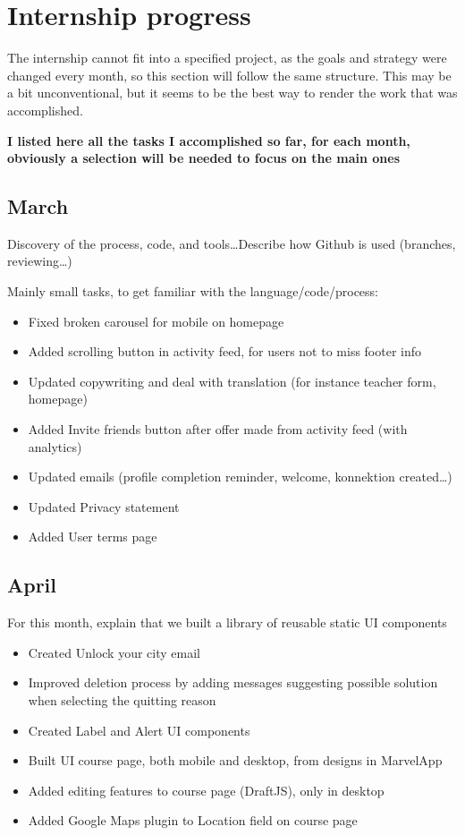 \section{Internship progress}
\label{sec:internship}

The internship cannot fit into a specified project, as the goals and strategy
were changed every month, so this section will follow the same structure.
This may be a bit unconventional, but it seems to be the best way to render
the work that was accomplished.

\textbf{I listed here all the tasks I accomplished so far, for each month,
obviously a selection will be needed to focus on the main ones}

\subsection{March}
\label{ssec:march}

Discovery of the process, code, and tools\ldots Describe how Github
is used (branches, reviewing\ldots)

Mainly small tasks, to get familiar with the language/code/process:
\begin{itemize}
\item Fixed broken carousel for mobile on homepage
\item Added scrolling button in activity feed, for users not to miss footer info
\item Updated copywriting and deal with translation (for instance teacher form,
homepage)
\item Added \guillemotleft Invite friends \guillemotright button after offer
made from activity feed (with analytics)
\item Updated emails (profile completion reminder, welcome, konnektion
created\ldots)
\item Updated Privacy statement
\item Added User terms page
\end{itemize}

\subsection{April}
\label{ssec:april}

For this month, explain that we built a library of reusable static UI components

\begin{itemize}
\item Created \guillemotleft Unlock your city \guillemotright email
\item Improved deletion process by adding messages suggesting possible solution
when selecting the quitting reason
\item Created Label and Alert UI components
\item Built UI course page, both mobile and desktop, from designs in MarvelApp
\item Added editing features to course page (DraftJS), only in desktop
\item Added Google Maps plugin to \guillemotleft Location \guillemotright field
on course page
\end{itemize}

